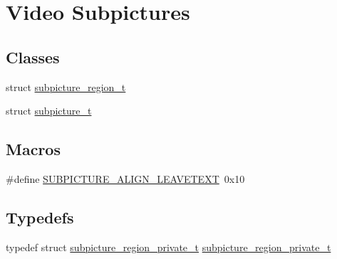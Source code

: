 \hypertarget{group__subpicture}{}\section{Video Subpictures}
\label{group__subpicture}
\subsection*{Classes}
\begin{DoxyCompactItemize}
\item 
struct \hyperlink{structsubpicture__region__t}{subpicture\+\_\+region\+\_\+t}
\item 
struct \hyperlink{structsubpicture__t}{subpicture\+\_\+t}
\end{DoxyCompactItemize}
\subsection*{Macros}
\begin{DoxyCompactItemize}
\item 
\#define \hyperlink{group__subpicture_ga8dcf59c7d34d151f9e34e1019041fb2c}{S\+U\+B\+P\+I\+C\+T\+U\+R\+E\+\_\+\+A\+L\+I\+G\+N\+\_\+\+L\+E\+A\+V\+E\+T\+E\+XT}~0x10
\end{DoxyCompactItemize}
\subsection*{Typedefs}
\begin{DoxyCompactItemize}
\item 
typedef struct \hyperlink{group__subpicture_ga9be3c246cffef0547fcebbc5d9282ebb}{subpicture\+\_\+region\+\_\+private\+\_\+t} \hyperlink{group__subpicture_ga9be3c246cffef0547fcebbc5d9282ebb}{subpicture\+\_\+region\+\_\+private\+\_\+t}
\end{DoxyCompactItemize}
